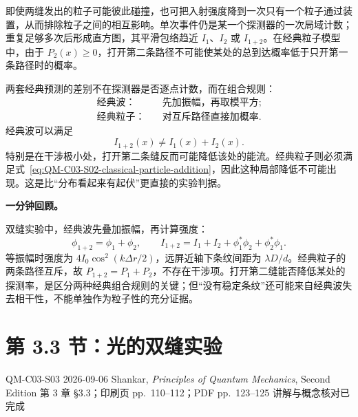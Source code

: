 即使两缝发出的粒子可能彼此碰撞，也可把入射强度降到一次只有一个粒子通过装置，从而排除粒子之间的相互影响。单次事件仍是某一个探测器的一次局域计数；重复足够多次后形成直方图，其平滑包络趋近 $I_1$、$I_2$ 或 $I_{1+2}$。在经典粒子模型中，由于 $P_2(x)\geq 0$，打开第二条路径不可能使某处的总到达概率低于只开第一条路径时的概率。


两套经典预测的差别不在探测器是否逐点计数，而在组合规则：
\begin{equation}
  \boxed{
  \begin{aligned}
    \text{经典波：}&\quad
    \text{先加振幅，再取模平方};\\
    \text{经典粒子：}&\quad
    \text{对互斥路径直接加概率}.
  \end{aligned}}
  \label{eq:QM-C03-S02-two-composition-rules}
\end{equation}
经典波可以满足
\[
  I_{1+2}(x)\neq I_1(x)+I_2(x).
\]
特别是在干涉极小处，打开第二条缝反而可能降低该处的能流。经典粒子则必须满足式~\eqref{eq:QM-C03-S02-classical-particle-addition}，因此这种局部降低不可能出现。这是比“分布看起来有起伏”更直接的实验判据。


\textbf{一分钟回顾。}

双缝实验中，经典波先叠加振幅，再计算强度：
\[
  \phi_{1+2}=\phi_1+\phi_2,
  \qquad
  I_{1+2}=I_1+I_2+\phi_1^*\phi_2+\phi_2^*\phi_1.
\]
等振幅时强度为 $4I_0\cos^2(k\Delta r/2)$，远屏近轴下条纹间距为 $\lambda D/d$。经典粒子的两条路径互斥，故 $P_{1+2}=P_1+P_2$，不存在干涉项。打开第二缝能否降低某处的探测率，是区分两种经典组合规则的关键；但“没有稳定条纹”还可能来自经典波失去相干性，不能单独作为粒子性的充分证据。

\section{第 3.3 节：光的双缝实验}
\label{section:QM-C03-S03}

\studymeta
  {QM-C03-S03}
  {2026-09-06}
  {Shankar, \textit{Principles of Quantum Mechanics}, Second Edition}
  {第 3 章 \S 3.3；印刷页 pp.~110--112；PDF pp.~123--125}
  {讲解与概念核对已完成}

